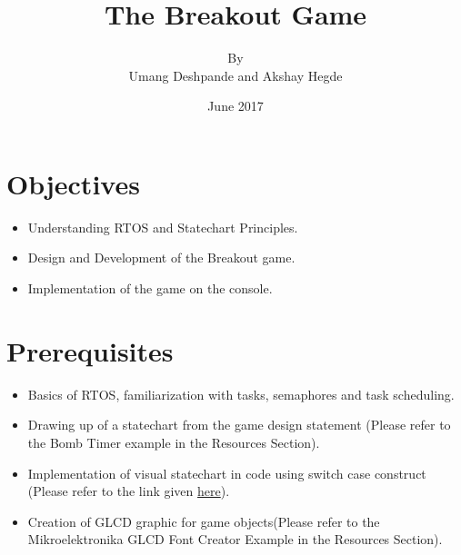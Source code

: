 \documentclass{article}
\title{The Breakout Game}
\author{By \\ Umang Deshpande and Akshay Hegde}
\date{June 2017}
\begin{document}
\maketitle

\section{Objectives}
\begin{itemize}
    \item Understanding RTOS and Statechart Principles.
    \item Design and Development of the Breakout game.
    \item Implementation of the game on the console.
\end{itemize}

\section{Prerequisites}
\begin{itemize}
    \item Basics of RTOS, familiarization with tasks, semaphores and task scheduling.
    \item Drawing up of a statechart from the game design statement (Please refer to the Bomb Timer example in the Resources Section).
    \item Implementation of visual statechart in code using switch case construct (Please refer to the link given \href{https://stackoverflow.com/questions/31100824/finite-state-machine-in-c}{here}).
    \item Creation of GLCD graphic for game objects(Please refer to the Mikroelektronika GLCD Font Creator Example in the Resources Section).
\end{itemize}
\end{document}

